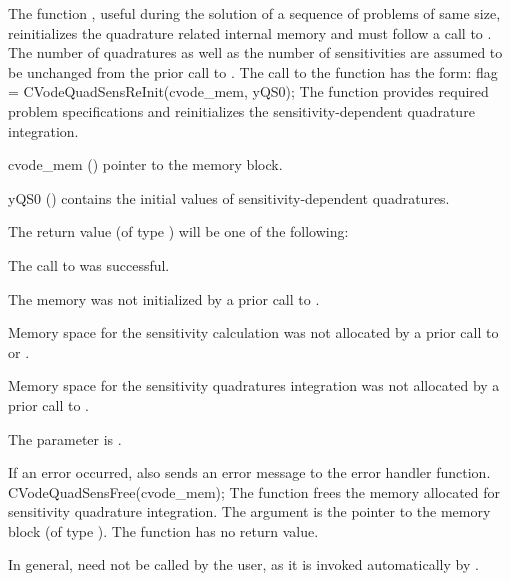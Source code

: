 The function , useful during the solution of a sequence 
of problems of same size, reinitializes the quadrature related internal memory 
and must follow a call to . The number  of 
quadratures as well as the number  of sensitivities are assumed to be 
unchanged from the prior call to .
The call to the  function has the form:
{
  flag = CVodeQuadSensReInit(cvode\_mem, yQS0);
}
{
  The function  provides required problem specifications 
  and reinitializes the sensitivity-dependent quadrature integration.
}
{
  \begin{args}
  \item[cvode\_mem] ()
    pointer to the {\cvodes} memory block.
  \item[yQS0] ()
    contains the initial values of sensitivity-dependent quadratures.
  \end{args}
}
{
  The return value  (of type ) will be one of the following:
  \begin{args}[CV\_NO\_QUADSENS]
  \item[\Id{CV\_SUCCESS}]
    The call to  was successful.
  \item[\Id{CVODE\_MEM\_NULL}] 
    The {\cvodes} memory was not initialized by a prior call to .
  \item[\Id{CV\_NO\_SENS}] 
    Memory space for the sensitivity calculation was not allocated by a prior
    call to  or .
  \item[\Id{CV\_NO\_QUADSENS}] 
    Memory space for the sensitivity quadratures integration was not allocated by a prior
    call to .
  \item[\Id{CV\_ILL\_INPUT}] 
    The parameter  is .
  \end{args}
}
{
  If an error occurred,  also sends an error message to the
  error handler function.
}
{
  CVodeQuadSensFree(cvode\_mem);
}
{
  The function  frees the memory allocated for sensitivity 
  quadrature integration.
}
{
  The argument is the pointer to the {\cvodes} memory block (of type ).
}
{
  The function  has no return value.
}
{
  In general,  need not be called by the user, as it is
  invoked automatically by .

}

